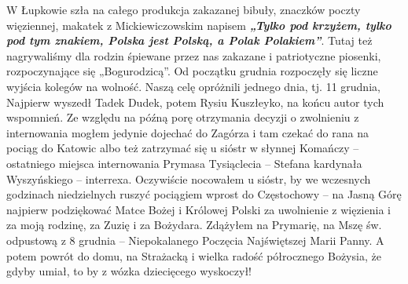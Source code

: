 W Łupkowie szła na całego produkcja zakazanej bibuły, znaczków poczty więziennej, makatek z Mickiewiczowskim napisem \textbf{\textit{„Tylko pod krzyżem, tylko pod tym znakiem, Polska jest Polską, a Polak Polakiem”}}. Tutaj też nagrywaliśmy dla rodzin śpiewane przez nas zakazane i patriotyczne piosenki, rozpoczynające się „Bogurodzicą”. Od początku grudnia rozpoczęły się liczne wyjścia kolegów na wolność. Naszą celę opróżnili jednego dnia, tj. 11 grudnia, Najpierw wyszedł Tadek Dudek, potem Rysiu Kuszłeyko, na końcu autor tych wspomnień. Ze względu na późną porę otrzymania decyzji o zwolnieniu z internowania mogłem jedynie dojechać do Zagórza i tam czekać do rana na pociąg do Katowic albo też zatrzymać się u sióstr w słynnej Komańczy – ostatniego miejsca internowania Prymasa Tysiąclecia – Stefana kardynała Wyszyńskiego – interrexa. Oczywiście nocowałem u sióstr, by we wczesnych godzinach niedzielnych ruszyć pociągiem wprost do Częstochowy – na Jasną Górę najpierw podziękować Matce Bożej i Królowej Polski za uwolnienie z więzienia i za moją rodzinę, za Zuzię i za Bożydara. Zdążyłem na Prymarię, na Mszę św. odpustową z 8 grudnia – Niepokalanego Poczęcia Najświętszej Marii Panny. A potem powrót do domu, na Strażacką i wielka radość półrocznego Bożysia, że gdyby umiał, to by z wózka dziecięcego wyskoczył!

